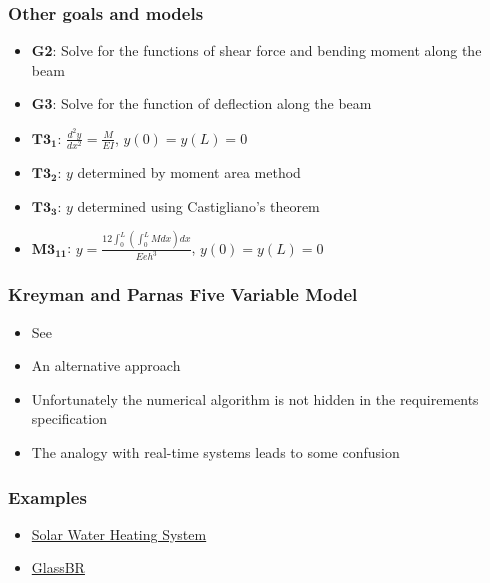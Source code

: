 \documentclass[t,12pt,numbers,fleqn]{beamer}
\begin{document}

\begin{frame}
\frametitle{Other goals and models}
\begin{itemize}
\item \textbf{G2}: Solve for the functions of shear force and bending moment along the beam
\item \textbf{G3}: Solve for the function of deflection along the beam
\item $\mathbf{T3_1}$: $\frac{d^2 y}{d x^2} = \frac{M}{EI}$, $y(0) = y(L) = 0$
\item $\mathbf{T3_2}$: $y$ determined by moment area method
\item $\mathbf{T3_3}$: $y$ determined using Castigliano's theorem
\item $\mathbf{M3_{11}}$: $y = \frac{12 \int_0^L (\int_0^L M dx) dx}{Eeh^3}$, $y(0) = y(L) = 0$
\end{itemize}
\end{frame}


\begin{frame}
\frametitle{Kreyman and Parnas Five Variable Model}
\begin{itemize}
\item See \cite{KreymanAndParnas2002}
\item An alternative approach
\item Unfortunately the numerical algorithm is not hidden in the requirements specification
\item The analogy with real-time systems leads to some confusion
\end{itemize}
\end{frame}


\begin{frame}
\frametitle{Examples}
\begin{itemize}
\item \href{https://github.com/smiths/swhs}{Solar Water Heating System}
\item \href{https://github.com/JacquesCarette/literate-scientific-software/tree/master/CaseStudies/glass/Documentation/SRS}{GlassBR}
\end{itemize}
\end{frame}

\end{document}
